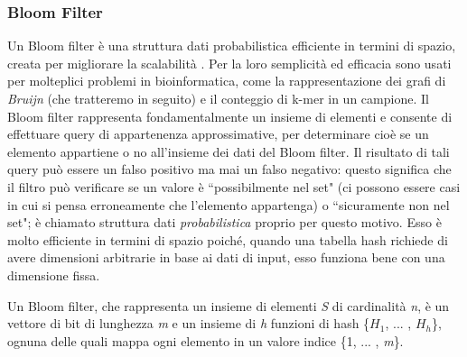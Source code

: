 \documentclass[../main.tex]{subfiles}
\begin{document}
\subsubsection{Bloom Filter}
\label{BloomFilter}
Un Bloom filter è una struttura dati probabilistica efficiente in termini di spazio, creata per migliorare la scalabilità \cite{sun-medvedev2018vargeno}. Per la loro semplicità ed efficacia sono usati per molteplici problemi in bioinformatica, come la rappresentazione dei grafi di \textit{Bruijn} (che tratteremo in seguito) e il conteggio di k-mer in un campione. Il Bloom filter rappresenta fondamentalmente un insieme di elementi e consente di effettuare query di appartenenza approssimative, per determinare cioè se un elemento appartiene o no all'insieme dei dati del Bloom filter. Il risultato di tali query può essere un falso positivo ma mai un falso negativo: questo significa che il filtro può verificare se un valore è ``possibilmente nel set" (ci possono essere casi in cui si pensa erroneamente che l'elemento appartenga) o ``sicuramente non nel set"; è chiamato struttura dati \textit{probabilistica} proprio per questo motivo. Esso è molto efficiente in termini di spazio poiché, quando una tabella hash richiede di avere dimensioni arbitrarie in base ai dati di input, esso funziona bene con una dimensione fissa.


\theoremstyle{definition}
\begin{definition} 

Un Bloom filter, che rappresenta un insieme di elementi \textit{S} di cardinalità \textit{n}, è un vettore di bit di lunghezza \textit{m} e un insieme di \textit{h} funzioni di hash \{$H_{1}$, ... , $H_{h}$\}, ognuna delle quali mappa ogni elemento in un valore indice \{1, ... , \textit{m}\}. 

\end{definition}
\end{document}
